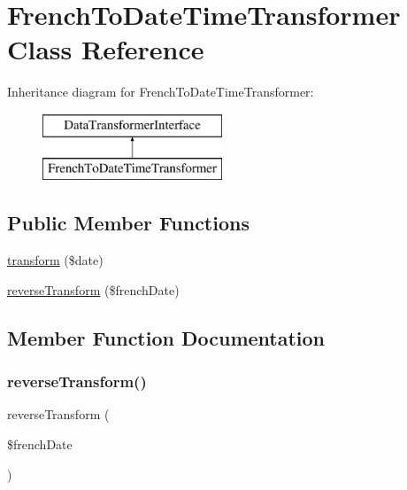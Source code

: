 \hypertarget{class_app_1_1_form_1_1_data_transformer_1_1_french_to_date_time_transformer}{}\section{French\+To\+Date\+Time\+Transformer Class Reference}
\label{class_app_1_1_form_1_1_data_transformer_1_1_french_to_date_time_transformer}
Inheritance diagram for French\+To\+Date\+Time\+Transformer\+:\begin{figure}[H]
\begin{center}
\leavevmode
\includegraphics[height=2.000000cm]{class_app_1_1_form_1_1_data_transformer_1_1_french_to_date_time_transformer}
\end{center}
\end{figure}
\subsection*{Public Member Functions}
\begin{DoxyCompactItemize}
\item 
\mbox{\hyperlink{class_app_1_1_form_1_1_data_transformer_1_1_french_to_date_time_transformer_a9282ce0f8c34e8f40806bac8a2b119ed}{transform}} (\$date)
\item 
\mbox{\hyperlink{class_app_1_1_form_1_1_data_transformer_1_1_french_to_date_time_transformer_aff4ba7b92d150905798494ef5f4c7309}{reverse\+Transform}} (\$french\+Date)
\end{DoxyCompactItemize}


\subsection{Member Function Documentation}
\mbox{\label{class_app_1_1_form_1_1_data_transformer_1_1_french_to_date_time_transformer_aff4ba7b92d150905798494ef5f4c7309}} 
\subsubsection{\texorpdfstring{reverseTransform()}{reverseTransform()}}
{\footnotesize\ttfamily reverse\+Transform (\begin{DoxyParamCaption}\item[{}]{\$french\+Date }\end{DoxyParamCaption})}

